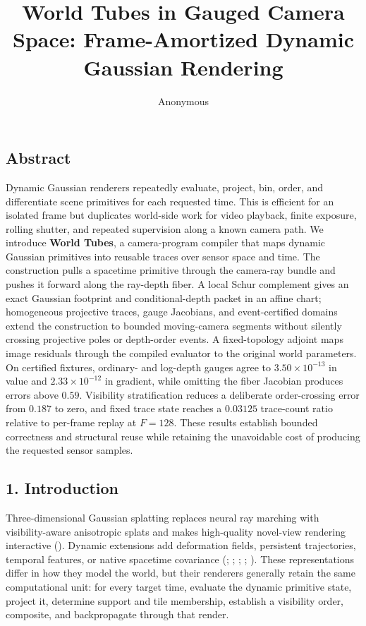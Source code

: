 \documentclass[
]{article}
\title{World Tubes in Gauged Camera Space: Frame-Amortized Dynamic
Gaussian Rendering}
\author{Anonymous}
\date{}
\begin{document}
\maketitle

\subsection{Abstract}\label{abstract}

Dynamic Gaussian renderers repeatedly evaluate, project, bin, order, and
differentiate scene primitives for each requested time. This is
efficient for an isolated frame but duplicates world-side work for video
playback, finite exposure, rolling shutter, and repeated supervision
along a known camera path. We introduce \textbf{World Tubes}, a
camera-program compiler that maps dynamic Gaussian primitives into
reusable traces over sensor space and time. The construction pulls a
spacetime primitive through the camera-ray bundle and pushes it forward
along the ray-depth fiber. A local Schur complement gives an exact
Gaussian footprint and conditional-depth packet in an affine chart;
homogeneous projective traces, gauge Jacobians, and event-certified
domains extend the construction to bounded moving-camera segments
without silently crossing projective poles or depth-order events. A
fixed-topology adjoint maps image residuals through the compiled
evaluator to the original world parameters. On certified fixtures,
ordinary- and log-depth gauges agree to \(3.50\times10^{-13}\) in value
and \(2.33\times10^{-12}\) in gradient, while omitting the fiber
Jacobian produces errors above \(0.59\). Visibility stratification
reduces a deliberate order-crossing error from \(0.187\) to zero, and
fixed trace state reaches a \(0.03125\) trace-count ratio relative to
per-frame replay at \(F=128\). These results establish bounded
correctness and structural reuse while retaining the unavoidable cost of
producing the requested sensor samples.

\subsection{1. Introduction}\label{introduction}

Three-dimensional Gaussian splatting replaces neural ray marching with
visibility-aware anisotropic splats and makes high-quality novel-view
rendering interactive ().
Dynamic extensions add deformation fields, persistent trajectories,
temporal features, or native spacetime covariance
(;
;
;
;
). These
representations differ in how they model the world, but their renderers
generally retain the same computational unit: for every target time,
evaluate the dynamic primitive state, project it, determine support and
tile membership, establish a visibility order, composite, and
backpropagate through that render.
\end{document}
